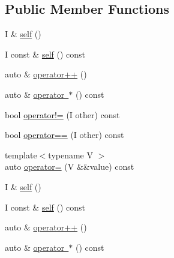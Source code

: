 \subsection*{Public Member Functions}
\begin{DoxyCompactItemize}
\item 
I \& \mbox{\hyperlink{structrah_1_1iterator__facade_3_01_i_00_01_r_00_01std_01_1_1output__iterator__tag_01_4_abe7859e4020df003875751114b067114}{self}} ()
\item 
I const  \& \mbox{\hyperlink{structrah_1_1iterator__facade_3_01_i_00_01_r_00_01std_01_1_1output__iterator__tag_01_4_a7241639571b436388ac1ccf4131b4ae2}{self}} () const
\item 
auto \& \mbox{\hyperlink{structrah_1_1iterator__facade_3_01_i_00_01_r_00_01std_01_1_1output__iterator__tag_01_4_a659213116532c917e96dafe69a5785fe}{operator++}} ()
\item 
auto \& \mbox{\hyperlink{structrah_1_1iterator__facade_3_01_i_00_01_r_00_01std_01_1_1output__iterator__tag_01_4_a7131cdd8b9cd56660a11021e4f9708b0}{operator $\ast$}} () const
\item 
bool \mbox{\hyperlink{structrah_1_1iterator__facade_3_01_i_00_01_r_00_01std_01_1_1output__iterator__tag_01_4_a72c1751a7267f5627a8bd21569a7e147}{operator!=}} (I other) const
\item 
bool \mbox{\hyperlink{structrah_1_1iterator__facade_3_01_i_00_01_r_00_01std_01_1_1output__iterator__tag_01_4_a41db7b320b25b73268ff256590fe306c}{operator==}} (I other) const
\item 
{\footnotesize template$<$typename V $>$ }\\auto \mbox{\hyperlink{structrah_1_1iterator__facade_3_01_i_00_01_r_00_01std_01_1_1output__iterator__tag_01_4_a0f85444e5a2d769ccffae7a6dce9a70d}{operator=}} (V \&\&value) const
\item 
I \& \mbox{\hyperlink{structrah_1_1iterator__facade_3_01_i_00_01_r_00_01std_01_1_1output__iterator__tag_01_4_abe7859e4020df003875751114b067114}{self}} ()
\item 
I const  \& \mbox{\hyperlink{structrah_1_1iterator__facade_3_01_i_00_01_r_00_01std_01_1_1output__iterator__tag_01_4_a7241639571b436388ac1ccf4131b4ae2}{self}} () const
\item 
auto \& \mbox{\hyperlink{structrah_1_1iterator__facade_3_01_i_00_01_r_00_01std_01_1_1output__iterator__tag_01_4_a659213116532c917e96dafe69a5785fe}{operator++}} ()
\item 
auto \& \mbox{\hyperlink{structrah_1_1iterator__facade_3_01_i_00_01_r_00_01std_01_1_1output__iterator__tag_01_4_a7131cdd8b9cd56660a11021e4f9708b0}{operator $\ast$}} () const

\end{DoxyCompactItemize}
